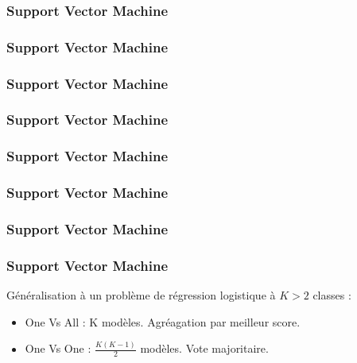 \begin{frame}
  \frametitle{Support Vector Machine}
\end{frame}

\begin{frame}
  \frametitle{Support Vector Machine}
\end{frame}

\begin{frame}
  \frametitle{Support Vector Machine}
\end{frame}

\begin{frame}
  \frametitle{Support Vector Machine}
\end{frame}

\begin{frame}
  \frametitle{Support Vector Machine}
\end{frame}

\begin{frame}
  \frametitle{Support Vector Machine}
\end{frame}

\begin{frame}
  \frametitle{Support Vector Machine}
\end{frame}

\begin{frame}
  \frametitle{Support Vector Machine}
  Généralisation à un problème de régression logistique à $K>2$ classes :
  \begin{itemize}
  \item One Vs All : K modèles. Agréagation par meilleur score.
  \item One Vs One : $\frac{K(K-1)}{2}$ modèles. Vote majoritaire.
  \end{itemize}
\end{frame}
